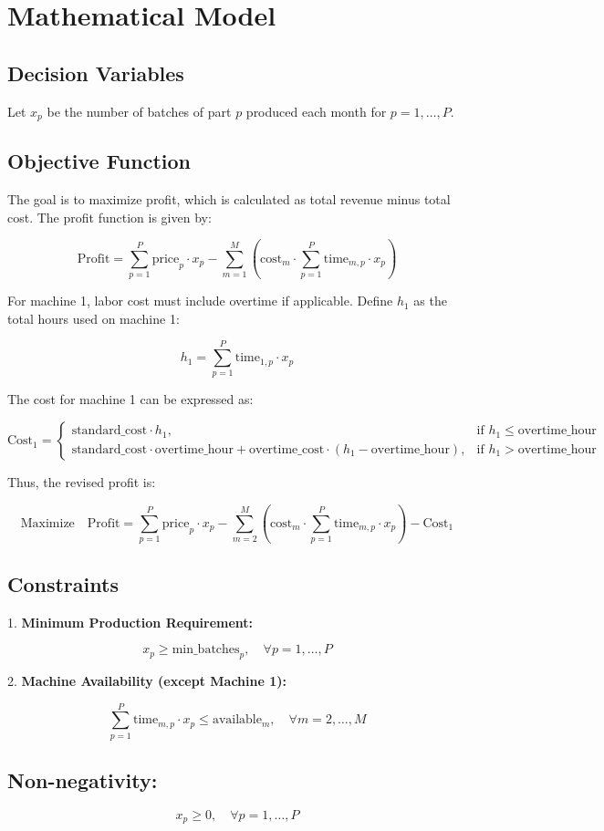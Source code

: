 \documentclass{article}
\begin{document}
\section*{Mathematical Model}

\subsection*{Decision Variables}

Let \( x_p \) be the number of batches of part \( p \) produced each month for \( p = 1, \ldots, P \).

\subsection*{Objective Function}

The goal is to maximize profit, which is calculated as total revenue minus total cost. The profit function is given by:

\[
\text{Profit} = \sum_{p=1}^{P} \text{price}_p \cdot x_p - \sum_{m=1}^{M} \left( \text{cost}_m \cdot \sum_{p=1}^{P} \text{time}_{m,p} \cdot x_p \right)
\]

For machine 1, labor cost must include overtime if applicable. Define \( h_1 \) as the total hours used on machine 1:

\[
h_1 = \sum_{p=1}^{P} \text{time}_{1,p} \cdot x_p
\]

The cost for machine 1 can be expressed as:

\[
\text{Cost}_1 = \begin{cases} 
    \text{standard\_cost} \cdot h_1, & \text{if } h_1 \leq \text{overtime\_hour} \\
    \text{standard\_cost} \cdot \text{overtime\_hour} + \text{overtime\_cost} \cdot (h_1 - \text{overtime\_hour}), & \text{if } h_1 > \text{overtime\_hour}
\end{cases}
\]

Thus, the revised profit is:

\[
\text{Maximize} \quad \text{Profit} = \sum_{p=1}^{P} \text{price}_p \cdot x_p - \sum_{m=2}^{M} \left( \text{cost}_m \cdot \sum_{p=1}^{P} \text{time}_{m,p} \cdot x_p \right) - \text{Cost}_1
\]

\subsection*{Constraints}

1. \textbf{Minimum Production Requirement:}

\[
x_p \geq \text{min\_batches}_p, \quad \forall p = 1, \ldots, P
\]

2. \textbf{Machine Availability (except Machine 1):}

\[
\sum_{p=1}^{P} \text{time}_{m,p} \cdot x_p \leq \text{available}_m, \quad \forall m = 2, \ldots, M
\]

\subsection*{Non-negativity:}

\[
x_p \geq 0, \quad \forall p = 1, \ldots, P
\]
\end{document}
